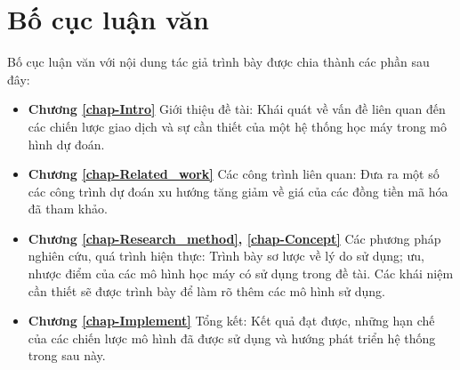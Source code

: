 \section{Bố cục luận văn}
Bố cục luận văn với nội dung tác giả trình bày được chia thành các phần sau đây:
\begin{itemize}
    \item \textbf{Chương \ref{chap-Intro}} Giới thiệu đề tài:
    Khái quát về vấn đề liên quan đến các chiến lược giao dịch và sự cần thiết của một hệ thống học máy trong mô hình dự đoán.
    \item \textbf{Chương \ref{chap-Related_work}} Các công trình liên quan:
    Đưa ra một số các công trình dự đoán xu hướng tăng giảm về giá của các đồng tiền mã hóa đã tham khảo.

    \item \textbf{Chương \ref{chap-Research_method}, \ref{chap-Concept}} Các phương pháp nghiên cứu, quá trình hiện thực:
    Trình bày sơ lược về lý do sử dụng; ưu, nhược điểm của các mô hình học máy có sử dụng trong đề tài. Các khái niệm cần thiết sẽ được trình bày để làm rõ thêm các mô hình sử dụng.

    \item \textbf{Chương \ref{chap-Implement}} Tổng kết:
    Kết quả đạt được, những hạn chế của các chiến lược mô hình đã được sử dụng và hướng phát triển hệ thống trong sau này.
    
\end{itemize}


